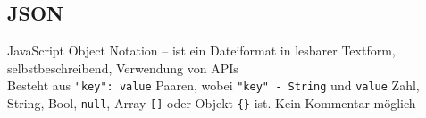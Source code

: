 \documentclass[12pt,landscape]{article}
\def\code#1{\texttt{#1}} %
\begin{document}
\begin{multicols}{3}
\section{JSON}
JavaScript Object Notation -- ist ein Dateiformat in lesbarer Textform, selbstbeschreibend, Verwendung von APIs\\
Besteht aus \lstinline|"key": value| Paaren, wobei \lstinline|"key" - String| und \lstinline|value| Zahl, String, Bool, \code{null}, Array \code{[]} oder Objekt \code{\{\}} ist. Kein Kommentar möglich\\

\end{multicols}
\end{document}
